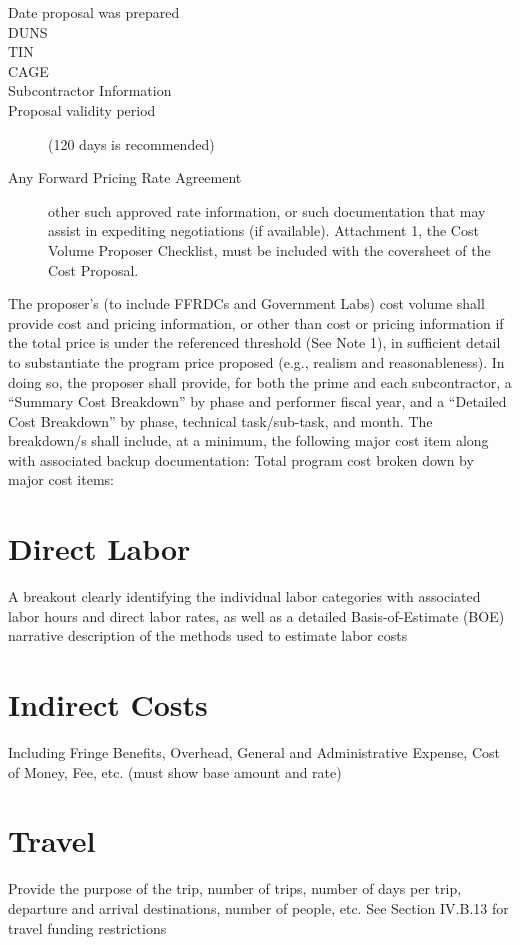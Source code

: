 \begin{description}
\item [Date proposal was prepared]
\item [DUNS]
\item [TIN]
\item [CAGE]
\item [Subcontractor Information]
\item [Proposal validity period] (120 days is recommended)
\item [Any Forward Pricing Rate Agreement] other such approved rate information, or such documentation that may assist in expediting negotiations (if available).
Attachment 1, the Cost Volume Proposer Checklist, must be included with the coversheet
of the Cost Proposal.
\end{description}
\newpage

The proposer’s (to include FFRDCs and Government Labs) cost volume shall provide cost and
pricing information, or other than cost or pricing information if the total price is under the
referenced threshold (See Note 1), in sufficient detail to substantiate the program price proposed
(e.g., realism and reasonableness). In doing so, the proposer shall provide, for both the prime
and each subcontractor, a “Summary Cost Breakdown” by phase and performer fiscal year,
and a “Detailed Cost Breakdown” by phase, technical task/sub-task, and month. The
breakdown/s shall include, at a minimum, the following major cost item along with associated
backup documentation:
Total program cost broken down by major cost items:

\section{Direct Labor}
A breakout clearly identifying the individual labor categories with associated labor hours and
direct labor rates, as well as a detailed Basis-of-Estimate (BOE) narrative description of the
methods used to estimate labor costs
\section{Indirect Costs}
Including Fringe Benefits, Overhead, General and Administrative Expense, Cost of Money,
Fee, etc. (must show base amount and rate)
\section{Travel}
Provide the purpose of the trip, number of trips, number of days per trip, departure and
arrival destinations, number of people, etc. See Section IV.B.13 for travel funding
restrictions
